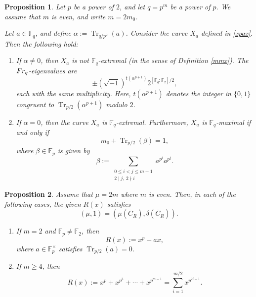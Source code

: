 \documentclass[10pt,a4paper]{amsart}
\newtheorem{proposition}{Proposition}
\def\F{{\mathbb F}}
\DeclareMathOperator{\Tr}{Tr}
\begin{document}
\begin{proposition}\label{Hermitian curve}
Let $p$ be a power of $2$, and let $q=p^m$ be a power of $p$.   We assume that $m$ is even, and write $m=2m_0$. 

Let $a\in \F_q$, and define $\alpha:=\Tr_{q/p^2}(a)$.  Consider the curve $X_a$ defined in \eqref{xpax}. Then the following hold: 
\begin{enumerate}
\item If $\alpha\neq0$, then $X_a$ is not $\F_q$-extremal (in the sense of Definition \ref{mmx}). The ${\rm Fr}_q$-eigenvalues are 
\[\pm(\sqrt{-1})^{t(\alpha^{p+1})}2^{[\F_q:\F_2]/2}, \]
each with the same multiplicity. Here, $t(\alpha^{p+1})$ denotes the integer in $\{0,1\}$ congruent to $\Tr_{p/2}(\alpha^{p+1})$ modulo $2$. 
\item If $\alpha=0$, then the curve $X_a$ is $\F_q$-extremal. Furthermore, $X_a$ is $\F_q$-maximal if and only if 
\[m_0+\Tr_{p/2}(\beta)=1,\]
 where $\beta\in\F_p$ is given by 
\[
\beta:=\sum_{\substack{0\leq i<j\leq m-1 \\ 2\mid j,\ 2\nmid i}}a^{p^i}a^{p^j}. 
\]
\end{enumerate}
\end{proposition}

\begin{proposition} \label{not well known case for period}
Assume that $\mu=2m$ where $m$ is even. Then, in each of the following cases, the given $R(x)$ satisfies 
\[
(\mu,1)=(\mu(\overline{C}_R),\delta(\overline{C}_R)). 
\]
\begin{enumerate}
    \item If $m=2$ and $\F_p\neq\F_2$, then 
    \[
    R(x):=x^p+ax, 
    \]
    where $a\in \F_p^\times$ satisfies $\Tr_{p/2}(a)=0$. 
\item If $m\geq4$, then 
    \[
R(x):=x^p+x^{p^3}+\cdots+x^{p^{m-1}}=\sum_{i=1}^{m/2}x^{p^{2i-1}}. 
\]
\end{enumerate}
\end{proposition}
\end{document}
